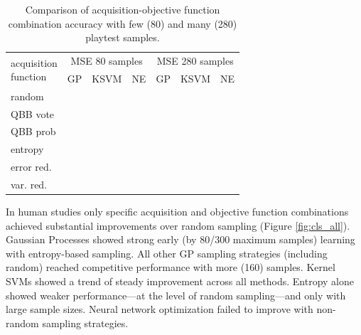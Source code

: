 \documentclass{sig-alternate}
\begin{document}
\begin{table}[tb]
\centering
\caption{Comparison of acquisition-objective function combination accuracy with few (80) and many (280) playtest samples.}
\begin{tabularx}{0.46\textwidth}{|X|c|c|c|c|c|c|}
\hline \multirow{2}{*}{\parbox[t]{5cm}{acquisition \\ function}} & \multicolumn{3}{|c|}{MSE 80 samples} & \multicolumn{3}{|c|}{MSE 280 samples}  \\ \cline{2-7}
& GP & KSVM & NE & GP & KSVM & NE \\ 
\hline random &  &  &  &  &  &  \\ 
\hline QBB vote &  &  &  &  &  &  \\ 
\hline QBB prob &  &  &  &  &  &  \\ 
\hline entropy &  &  &  &  &  &  \\ 
\hline error red. &  &  &  &  &  &  \\ 
\hline var. red. &  &  &  &  &  &  \\ 
\hline 
\end{tabularx}
\label{tab:cls_expr}
\end{table}

In human studies only specific acquisition and objective function combinations achieved substantial improvements over random sampling (Figure \ref{fig:cls_all}).
%
Gaussian Processes showed strong early (by 80/300 maximum samples) learning with entropy-based sampling.
All other GP sampling strategies (including random) reached competitive performance with more (160) samples.
Kernel SVMs showed a trend of steady improvement across all methods.
Entropy alone showed weaker performance---at the level of random sampling---and only with large sample sizes.
Neural network optimization failed to improve with non-random sampling strategies.
\end{document}
